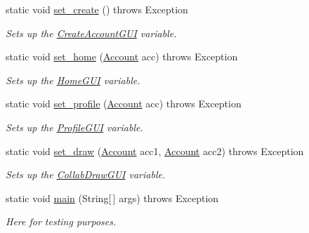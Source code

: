 \begin{DoxyCompactItemize}
\mbox{\label{class_main_a34548bd2b4340a9988b3a746954d7d9a}} 
static void \hyperlink{class_main_a34548bd2b4340a9988b3a746954d7d9a}{set\+\_\+create} ()  throws Exception     
\begin{DoxyCompactList}\small\item\em Sets up the \hyperlink{class_create_account_g_u_i}{Create\+Account\+G\+UI} variable. \end{DoxyCompactList}\item 
\mbox{\label{class_main_a28021e928cc0f251eaadfe64226890c8}} 
static void \hyperlink{class_main_a28021e928cc0f251eaadfe64226890c8}{set\+\_\+home} (\hyperlink{class_account}{Account} acc)  throws Exception     
\begin{DoxyCompactList}\small\item\em Sets up the \hyperlink{class_home_g_u_i}{Home\+G\+UI} variable. \end{DoxyCompactList}\item 
\mbox{\label{class_main_a97617e73a5156ccc2c900054cdfa3b23}} 
static void \hyperlink{class_main_a97617e73a5156ccc2c900054cdfa3b23}{set\+\_\+profile} (\hyperlink{class_account}{Account} acc)  throws Exception     
\begin{DoxyCompactList}\small\item\em Sets up the \hyperlink{class_profile_g_u_i}{Profile\+G\+UI} variable. \end{DoxyCompactList}\item 
\mbox{\label{class_main_a7c2f08652e3be5429bc978707078bed9}} 
static void \hyperlink{class_main_a7c2f08652e3be5429bc978707078bed9}{set\+\_\+draw} (\hyperlink{class_account}{Account} acc1, \hyperlink{class_account}{Account} acc2)  throws Exception     
\begin{DoxyCompactList}\small\item\em Sets up the \hyperlink{class_collab_draw_g_u_i}{Collab\+Draw\+G\+UI} variable. \end{DoxyCompactList}\item 
\mbox{\label{class_main_a8a5d0f827edddff706cc0e6740d0579a}} 
static void \hyperlink{class_main_a8a5d0f827edddff706cc0e6740d0579a}{main} (String\mbox{[}$\,$\mbox{]} args)  throws Exception     
\begin{DoxyCompactList}\small\item\em Here for testing purposes. \end{DoxyCompactList}\end{DoxyCompactItemize}

